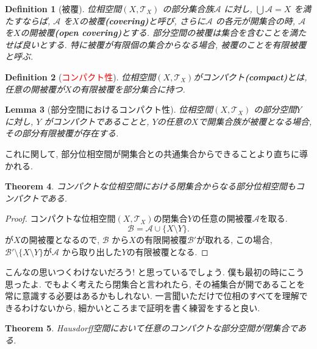 \documentclass[dvipdfmx]{jbook}
\newtheorem{theorem}{Theorem}[section]
\newtheorem{lemma}[theorem]{Lemma}
\newtheorem{definition}[theorem]{Definition}
\theoremstyle{remark}
\theoremstyle{plain}
\begin{document}
\begin{definition}[被覆]
	位相空間$\left( X , \mathcal{T}_{X} \right)$ の部分集合族$\mathcal{A}$ に対し, $ \bigcup \mathcal{A} = X$ を満たすならば, $\mathcal{A}$ を$X$の被覆\textbf{(covering)}と呼び,  さらに$\mathcal{A}$ の各元が開集合の時, $\mathcal{A}$ を$X$の開被覆\textbf{(open covering)}とする. 部分空間の被覆は集合を含むことを満たせば良いとする. 特に被覆が有限個の集合からなる場合, 被覆のことを有限被覆と呼ぶ.
\end{definition}

\begin{definition}[\textcolor{red}{コンパクト性}]
	位相空間$\left( X , \mathcal{T}_{X} \right)$がコンパクト\textbf{(compact)}とは, 任意の開被覆が$X$の有限被覆を部分集合に持つ.	
\end{definition}

\begin{lemma}[部分空間におけるコンパクト性]
	位相空間$\left( X , \mathcal{T}_{X} \right)$ の部分空間$Y$ に対し, 
	$Y$ がコンパクトであることと,  $Y$の任意の$X$で開集合族が被覆となる場合, その部分有限被覆が存在する.
\end{lemma}

これに関して, 部分位相空間が開集合との共通集合からできることより直ちに導かれる.

\begin{theorem}
	コンパクトな位相空間における閉集合からなる部分位相空間もコンパクトである.
\end{theorem}

\begin{proof}
	コンパクトな位相空間$\left( X , \mathcal{T}_{X} \right)$の閉集合$Y$の任意の開被覆$\mathcal{A}$を取る.
	\[
		\mathcal{B}= \mathcal{A} \cup \{X \setminus Y\}
	.\] 
	が$X$の開被覆となるので,  $\mathcal{B}$ から$X$の有限開被覆$\mathcal{B'}$が取れる, この場合, $\mathcal{B'} \setminus \{ X \setminus Y\}$が$\mathcal{A}$ から取り出した$Y$の有限被覆となる. 
\end{proof}

こんなの思いつくわけないだろう! と思っているでしょう. 僕も最初の時にこう思ったよ. 
でもよく考えたら閉集合と言われたら, その補集合が開であることを常に意識する必要はあるかもしれない. 
一言聞いただけで位相のすべてを理解できるわけないから, 細かいところまで証明を書く練習をすると良い.

\begin{theorem}
	Hausdorff空間において任意のコンパクトな部分空間が閉集合である.
\end{theorem}
\end{document}
